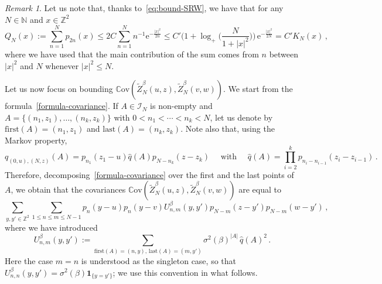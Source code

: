 \documentclass[11pt]{amsart}
\numberwithin{equation}{section}
\newcommand*{\ind}{\mathbf{1}}
\newcommand*{\numberset}{\mathbb}
\newcommand*{\N}{\numberset{N}}
\newcommand*{\Z}{\numberset{Z}}
\newcommand{\e}{\mathrm{e}}
\newcommand*{\Cov}{\mathbb{C}\mathrm{ov}}
\theoremstyle{plain}
\theoremstyle{definition}
\theoremstyle{remark}
\newtheorem{remark}[theorem]{Remark}
\newcommand{\blue}{\color{blue}}
\begin{document}
\begin{remark}
       \label{rem:compare-K-Q}
Let us note that, thanks to~\eqref{eq:bound-SRW}, we have that for any \(N\in \N\) and \(x\in \Z^2\)
\begin{equation*}
       Q_N(x) := \sum_{n=1}^{N} p_{2n}(x) \leq  2C  \sum_{n=1}^N n^{-1} \e^{- \frac{|x|^2}{2n}} \leq C'\Big(1+\log_+\Big(\frac{N}{1+|x|^2} \Big) \Big)\, \e^{- \frac{|x|^2}{2N}} =  C' K_N(x) \,,
\end{equation*}
where we have used that the main contribution of the sum comes from \(n\) between \(|x|^2\) and \(N\) whenever \(|x|^2\leq N\). 
\end{remark}

Let us now focus on bounding \(\Cov(\tilde Z_N^{\beta}(u,z), \tilde Z_N^{\beta}(v,w))\).
We start from the formula~\eqref{formula-covariance}.
If \(A \in \mathcal{I}_N\) is non-empty and \(A =\{(n_1,z_1), \ldots, (n_k,z_k)\}\) with \(0<n_1<\cdots <n_k < N\), let us denote by \(\mathrm{first}(A) = (n_1,z_1)\) and \(\mathrm{last}(A) = (n_k,z_k)\).
Note also that, using the Markov property,
\[
q_{(0,u),(N,z)}(A) = p_{n_1}(z_1-u) \hat{q}(A) p_{N-n_k}(z-z_k) \quad \text{ with } \quad \hat q(A) = \prod_{i=2}^{k} p_{n_i-n_{i-1}}(z_i-z_{i-1}) \,.
\]
Therefore, decomposing~\eqref{formula-covariance} over the first and the last points of~\(A\), we obtain that the covariances \(\Cov(\tilde Z_N^{\beta}(u,z), \tilde Z_N^{\beta}(v,w))\) are equal to
\begin{equation}
       \label{eq:covariance-0}
       \sum_{y,y' \in \Z^2} \sum_{1\leq n \leq m \leq N-1} 
       p_n(y-u) p_{n}(y-v) U_{n,m}^{\beta} (y,y') p_{N-m}(z-y') p_{N-m}(w-y') \,,     
\end{equation}
where we have introduced
\[
U_{n,m}^{\beta} (y,y'):= 
\sum_{ \mathrm{first}(A) = (n,y) ,\, \mathrm{last}(A) = (m,y') } \sigma^2(\beta)^{|A|} \, \hat q(A)^2\,.
\]
Here the case \(m=n\) is understood as the singleton case, so that \(U_{n,n}^{\beta}(y,y')=\sigma^2(\beta)\ind_{\{y=y'\}}\); we use this convention in what follows.
\end{document}
